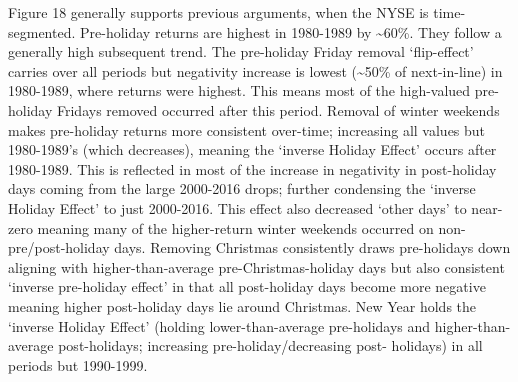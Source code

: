 \documentclass[11pt, english]{article}
\begin{document}
	Figure 18 generally supports previous arguments, when the NYSE is time-segmented. Pre-holiday returns are highest in 1980-1989 by \~{}60\%. They follow a generally high subsequent trend. The pre-holiday Friday removal `flip-effect' carries over all periods but negativity increase is lowest (\~{}50\% of next-in-line) in 1980-1989, where returns were highest. This means most of the high-valued pre-holiday Fridays removed occurred after this period. Removal of winter weekends makes pre-holiday returns more consistent over-time; increasing all values but 1980-1989’s (which decreases), meaning the `inverse Holiday Effect' occurs after 1980-1989. This is reflected in most of the increase in negativity in post-holiday days coming from the large 2000-2016 drops; further condensing the `inverse Holiday Effect' to just 2000-2016. This effect also decreased `other days' to near-zero meaning many of the higher-return winter weekends occurred on non-pre/post-holiday days. Removing Christmas consistently draws pre-holidays down aligning with higher-than-average pre-Christmas-holiday days but also consistent `inverse pre-holiday effect' in that all post-holiday days become more negative meaning higher post-holiday days lie around Christmas. New Year holds the `inverse Holiday Effect' (holding lower-than-average pre-holidays and higher-than-average post-holidays; increasing pre-holiday/decreasing post- holidays) in all periods but 1990-1999.
\end{document}
